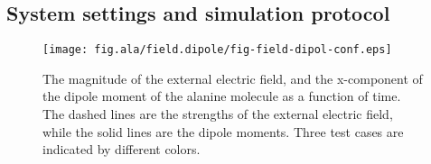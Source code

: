 \documentclass[aip,jcp,a4paper,preprint,onecolumn]{revtex4-1}
\begin{document}
\subsection{System settings and simulation protocol}
\begin{figure}
  \centering
  \texttt{[image: fig.ala/field.dipole/fig-field-dipol-conf.eps]}
  \caption{The magnitude of the external electric field, and the
    x-component of the dipole moment of the alanine molecule as a
    function of time. The dashed lines are the strengths of the
    external electric field, while the solid lines are the dipole
    moments. Three test cases are indicated by different colors.}
  \label{fig:tmp3}
\end{figure}
\end{document}
